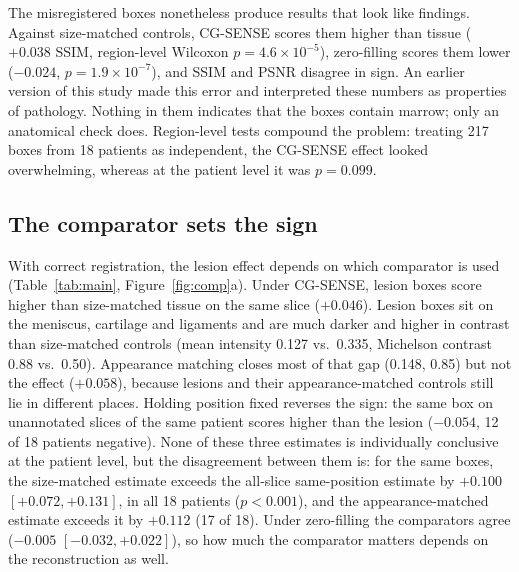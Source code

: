 \documentclass[letterpaper]{article} %
\begin{document}
The misregistered boxes nonetheless produce results that look like findings.
Against size-matched controls, CG-SENSE scores them higher than tissue
($+0.038$ SSIM, region-level Wilcoxon $p=4.6\times10^{-5}$), zero-filling
scores them lower ($-0.024$, $p=1.9\times10^{-7}$), and SSIM and PSNR disagree
in sign. An earlier version of this study made this error and interpreted
these numbers as properties of pathology. Nothing in them indicates that the
boxes contain marrow; only an anatomical check does. Region-level tests
compound the problem: treating 217 boxes from 18 patients as independent, the
CG-SENSE effect looked overwhelming, whereas at the patient level it was
$p=0.099$.



\subsection{The comparator sets the sign}




With correct registration, the lesion effect depends on which comparator is
used (Table~\ref{tab:main}, Figure~\ref{fig:comp}a). Under CG-SENSE, lesion
boxes score higher than size-matched tissue on the same slice ($+0.046$).
Lesion boxes sit on the meniscus, cartilage and ligaments and are much darker
and higher in contrast than size-matched controls (mean intensity 0.127 vs.\
0.335, Michelson contrast 0.88 vs.\ 0.50). Appearance matching closes most of
that gap (0.148, 0.85) but not the effect ($+0.058$), because lesions and
their appearance-matched controls still lie in different places. Holding
position fixed reverses the sign: the same box on unannotated slices of the
same patient scores higher than the lesion ($-0.054$, 12 of 18 patients
negative). None of these three estimates is individually conclusive at the
patient level, but the disagreement between them is: for the same boxes, the
size-matched estimate exceeds the all-slice same-position estimate by
$+0.100$ $[+0.072, +0.131]$, in all 18 patients ($p<0.001$), and the
appearance-matched estimate exceeds it by $+0.112$ (17 of 18). Under
zero-filling the comparators agree ($-0.005$ $[-0.032, +0.022]$), so how much
the comparator matters depends on the reconstruction as well.
\end{document}
